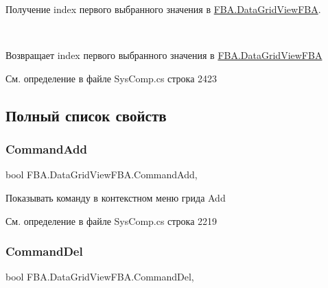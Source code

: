 Получение index первого выбранного значения в \mbox{\hyperlink{class_f_b_a_1_1_data_grid_view_f_b_a}{F\+B\+A.\+Data\+Grid\+View\+F\+BA}}. 

~\newline
\begin{DoxyReturn}{Возвращает}
index первого выбранного значения в \mbox{\hyperlink{class_f_b_a_1_1_data_grid_view_f_b_a}{F\+B\+A.\+Data\+Grid\+View\+F\+BA}}
\end{DoxyReturn}


См. определение в файле Sys\+Comp.\+cs строка 2423



\subsection{Полный список свойств}
\mbox{\label{class_f_b_a_1_1_data_grid_view_f_b_a_a1428b725a17156be63ee843e43ed66d1}} 
\subsubsection{\texorpdfstring{Command\+Add}{CommandAdd}}
{\footnotesize\ttfamily bool F\+B\+A.\+Data\+Grid\+View\+F\+B\+A.\+Command\+Add\hspace{0.3cm}{\ttfamily [get]}, {\ttfamily [set]}}



Показывать команду в контекстном меню грида Add 



См. определение в файле Sys\+Comp.\+cs строка 2219

\mbox{\label{class_f_b_a_1_1_data_grid_view_f_b_a_aa2b7e0376e10b29a29abfe805d0fe022}} 
\subsubsection{\texorpdfstring{Command\+Del}{CommandDel}}
{\footnotesize\ttfamily bool F\+B\+A.\+Data\+Grid\+View\+F\+B\+A.\+Command\+Del\hspace{0.3cm}{\ttfamily [get]}, {\ttfamily [set]}}



